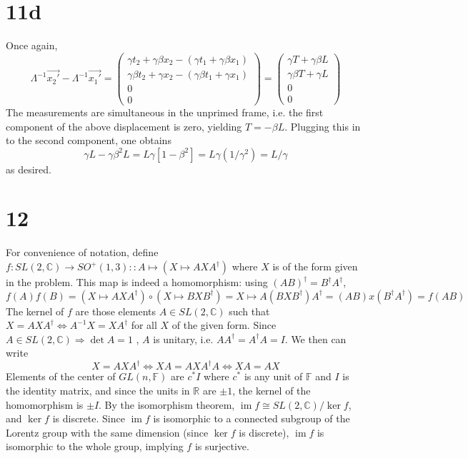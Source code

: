 \documentclass{article}
\DeclareMathOperator{\im}{im}
\begin{document}
\section*{11d}
Once again,
\[
  \Lambda^{-1}\vec{x_{2}'}-\Lambda^{-1}\vec{x_{1}'}
  =
  \begin{pmatrix}
    \gamma t_{2}+\gamma\beta x_{2}-(\gamma t_{1}+\gamma\beta x_{1}) \\
    \gamma\beta t_{2}+\gamma x_{2}-(\gamma\beta t_{1}+\gamma x_{1}) \\
    0 \\
    0
  \end{pmatrix}
  =
  \begin{pmatrix}
    \gamma T + \gamma\beta L \\
    \gamma \beta T + \gamma L \\
    0 \\
    0
  \end{pmatrix}
\]
The measurements are simultaneous in the unprimed frame, i.e. the first component of the above displacement is zero, yielding
$T=-\beta L$.
Plugging this in to the second component, one obtains
\[
  \gamma L-\gamma\beta^{2}L=L\gamma[1-\beta^{2}]=L\gamma(1/\gamma^{2})=L/\gamma
\]
as desired.

\section*{12}
For convenience of notation, define $f:SL(2,\mathbb{C})\to SO^{+}(1,3) :: A\mapsto (X\mapsto AXA^{\dagger})$ where $X$ is of the form
given in the problem.
This map is indeed a homomorphism: using $(AB)^{\dagger}=B^{\dagger}A^{\dagger}$,
\[
  f(A)f(B)=(X\mapsto AXA^{\dagger})\circ(X\mapsto BXB^{\dagger})=X\mapsto A(BXB^{\dagger})A^{\dagger}=(AB)x(B^{\dagger}A^{\dagger})
  =f(AB)
\]
The kernel of $f$ are those elements $A\in SL(2,\mathbb{C})$ such that $X=AXA^{\dagger}\Leftrightarrow A^{-1}X=XA^{\dagger}$ for all $X$ of
the given form.
Since $A\in SL(2,\mathbb{C})\Rightarrow \det A=1$ , $A$ is unitary, i.e. $AA^{\dagger}=A^{\dagger}A=I$.
We then can write
\[
  X=AXA^{\dagger}
  \Leftrightarrow XA=AXA^{\dagger}A
  \Leftrightarrow XA=AX
\]
Elements of the center of $GL(n,\mathbb{F})$ are $c^{*}I$ where $c^{*}$ is any unit of $\mathbb{F}$ and $I$ is the identity matrix, and
since the units in $\mathbb{R}$ are $\pm 1$, the kernel of the homomorphism is $\pm I$.
By the isomorphism theorem, $\im f\cong SL(2,\mathbb{C})/\ker f$, and $\ker f$ is discrete.
Since $\im f$ is isomorphic to a connected subgroup of the Lorentz group with the same dimension (since $\ker f$ is discrete), $\im f$ is isomorphic to the whole group,
implying $f$ is surjective.
\end{document}
